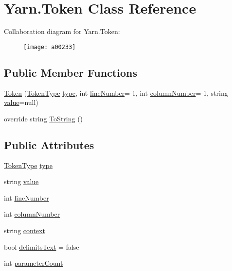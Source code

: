 \hypertarget{a00079}{\section{Yarn.\-Token Class Reference}
\label{a00079}
}


Collaboration diagram for Yarn.\-Token\-:
\nopagebreak
\begin{figure}[H]
\begin{center}
\leavevmode
\texttt{[image: a00233]}
\end{center}
\end{figure}
\subsection*{Public Member Functions}
\begin{DoxyCompactItemize}
\item 
\hyperlink{a00079_a5b307a925a1606db47866b31cea71386}{Token} (\hyperlink{a00026_a301aa7c866593a5b625a8fc158bbeace}{Token\-Type} \hyperlink{a00079_a471a25da67fda0524f2375f9a882aafa}{type}, int \hyperlink{a00079_a80fe710713201bb793a41452e314a721}{line\-Number}=-\/1, int \hyperlink{a00079_a9a0f0a8a7ab1e90ab48f15192323ffca}{column\-Number}=-\/1, string \hyperlink{a00079_a3df6b32d6190a639619a3f064c2154e2}{value}=null)
\item 
override string \hyperlink{a00079_abf676a737679ec2fb1dffd75dc4d7976}{To\-String} ()
\end{DoxyCompactItemize}
\subsection*{Public Attributes}
\begin{DoxyCompactItemize}
\item 
\hyperlink{a00026_a301aa7c866593a5b625a8fc158bbeace}{Token\-Type} \hyperlink{a00079_a471a25da67fda0524f2375f9a882aafa}{type}
\item 
string \hyperlink{a00079_a3df6b32d6190a639619a3f064c2154e2}{value}
\item 
int \hyperlink{a00079_a80fe710713201bb793a41452e314a721}{line\-Number}
\item 
int \hyperlink{a00079_a9a0f0a8a7ab1e90ab48f15192323ffca}{column\-Number}
\item 
string \hyperlink{a00079_a089d248c904a6e8366b81c2c47ff5af8}{context}
\item 
bool \hyperlink{a00079_af15d26fa4e6f276ab58ff66d3c4203da}{delimits\-Text} = false
\item 
int \hyperlink{a00079_adf11c0d29b66935a8d8109d6308d0488}{parameter\-Count}
\end{DoxyCompactItemize}


